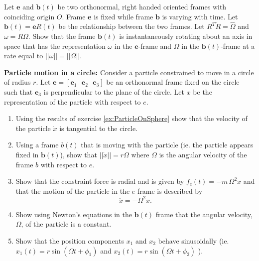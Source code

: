 \documentclass[graybox,envcountchap,sectrefs]{svmonoMuga}
\begin{document}
\begin{exercise}\label{ex:InfinitesimalRotations}
Let $\mathbf{e}$ and $\mathbf{b}(t)$ be two orthonormal, right handed oriented frames with coinciding origin $O$. Frame $\mathbf{e}$ is fixed while frame $\mathbf{b}$ is varying with time. Let $\mathbf{b}(t)=\mathbf{e}R(t)$ be the relationship between the two frames. Let $R^T\dot{R}=\widehat{\Omega}$ and $\omega=R\Omega$.
Show that the frame $\mathbf{b}(t)$ is instantaneously rotating about an axis in space that has the representation $\omega$ in the $\mathbf{e}$-frame and $\Omega$ in the $\mathbf{b}(t)$-frame at a rate equal to $||\omega||=||\Omega||$. 
\end{exercise}


\begin{exercise} {\bf \sf Particle motion in a circle:}\label{ex:ParticleOnCircle} Consider a particle constrained to move in a circle of radius $r$. Let $\mathbf{e}=[\mathbf{e}_1\:\:\:\mathbf{e}_2\:\:\:\mathbf{e}_3]$ be an orthonormal frame fixed on the circle such that $\mathbf{e}_3$ is perpendicular to the plane of the circle. Let $x$ be the representation of the particle with respect to $e$.
\begin{enumerate}
\item Using the results of exercise \ref{ex:ParticleOnSphere} show that the velocity of the particle $\dot{x}$ is tangential to the circle.
\item Using a frame $b(t)$ that is moving with the particle (ie. the particle appears fixed in $\mathbf{b}(t)$), show that $||\dot{x}||=r\Omega$ where $\Omega$ is the angular velocity of the frame $b$ with respect to $e$.
\item \label{exx:ss}  Show that the constraint force is radial and is given by $f_c(t)=-m\,\Omega^2 x$ and
that the motion of the particle in the $e$ frame is described by
\[
\ddot{x}=-\Omega^2 x.
\]
\item Show using Newton's equations in the $\mathbf{b}(t)$ frame  that the angular velocity, $\Omega$, of the particle is a constant.

\item Show that the position components $x_1$ and $x_2$ behave sinusoidally (ie. $x_1(t)=r\sin{(\Omega t+\phi_1)}$ and $x_2(t)=r\sin{(\Omega t+\phi_2)}$ ).
\end{enumerate}
\end{exercise}
\end{document}
